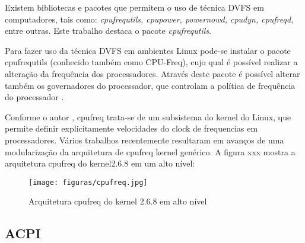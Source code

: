 Existem bibliotecas e pacotes que permitem o uso de técnica DVFS em computadores, tais como: \textit{cpufrequtils, cpupower, powernowd, cpudyn, cpufreqd}, entre outras. Este trabalho destaca o pacote \textit{cpufrequtils}.

Para fazer uso da técnica DVFS em ambientes Linux pode-se instalar o pacote cpufrequtils (conhecido também como CPU-Freq), cujo qual é possível realizar a alteração da frequência dos processadores. Através deste pacote é possível alterar também os governadores do processador, que controlam a política de frequência do processador \cite{lara2013resoluccao}.

Conforme o autor \cite{cpufreqintel}, cpufreq trata-se de um subsistema do kernel do Linux, que permite definir explicitamente velocidades do clock de frequencias em processadores. Vários  trabalhos recentemente resultaram em avanços de uma modularização da arquitetura de cpufreq kernel genérico. A figura xxx mostra a arquitetura cpufreq do kernel2.6.8 em um alto nível:

\begin{figure}[htb]
	\caption{\label{fig:cpufreq}Arquitetura cpufreq do kernel 2.6.8 em alto nível}
	\begin{center}
	    \texttt{[image: figuras/cpufreq.jpg]}
	\end{center}
\end{figure}



\subsection{ACPI}


